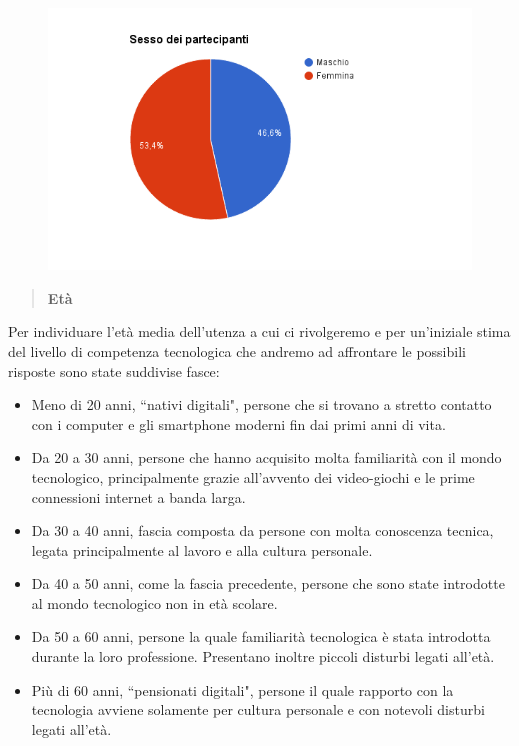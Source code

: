 \begin{figure}[H]
	\centering
	\includegraphics[scale=0.6]{img/chart_sesso}
\end{figure}

\begin{quote}
	\textbf{Età}
\end{quote}
Per individuare l'età media dell'utenza a cui ci rivolgeremo e per un'iniziale stima del livello
di competenza tecnologica che andremo ad affrontare le possibili risposte sono
state suddivise fasce:
\begin{itemize}
		\item Meno di 20 anni, ``nativi digitali", persone che si
			trovano a stretto contatto con i computer e gli
			smartphone moderni fin dai primi anni di vita.

		\item Da 20 a 30 anni, persone che hanno acquisito molta
			familiarità con il mondo tecnologico, principalmente
			grazie all'avvento dei video-giochi e le prime connessioni
			internet a banda larga.

		\item Da 30 a 40 anni, fascia composta da persone con molta conoscenza tecnica,
			legata principalmente al lavoro e alla cultura
			personale.

		\item Da 40 a 50 anni, come la fascia precedente, persone che
			sono state introdotte al mondo tecnologico non in età
			scolare.

		\item Da 50 a 60 anni, persone la quale familiarità tecnologica è
			stata introdotta durante la loro professione.
			Presentano inoltre piccoli disturbi legati all'età.

		\item Più di 60 anni, ``pensionati digitali",  persone il quale rapporto con la
			tecnologia avviene solamente per cultura personale e con
			notevoli disturbi legati all'età.
\end{itemize}

